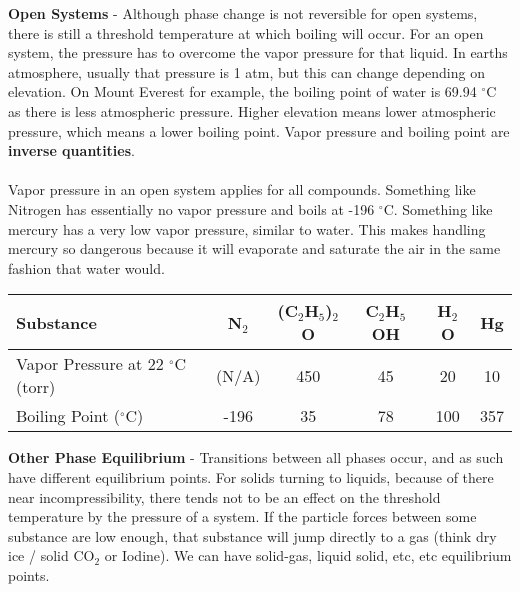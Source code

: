 \documentclass{article}
\begin{document}
\noindent\textbf{Open Systems} - Although phase	change is not reversible for open systems, there is still a threshold temperature at which boiling will occur. For an open system, the pressure has to overcome the vapor pressure for that liquid. In earths atmosphere, usually that pressure is 1 atm, but this can change depending on elevation. On Mount Everest for example, the boiling point of water is 69.94 $^{\circ} $C as there is less atmospheric pressure. Higher elevation means lower atmospheric pressure, which means a lower boiling point. Vapor pressure and boiling point are \textbf{inverse quantities}.\\
\\
Vapor pressure in an open system applies for all compounds. Something like Nitrogen has essentially no vapor pressure and boils at -196 $^{\circ}$C. Something like mercury has a very low vapor pressure, similar to water. This makes handling mercury so dangerous because it will evaporate and saturate the air in the same fashion that water would.

\vspace{10pt}
\renewcommand{\Tstrut}{\rule{0pt}{3.3ex}}         %
\renewcommand{\Bstrut}{\rule[-2ex]{0pt}{0pt}}   %
\renewcommand{\TBstrut}{\Tstrut\Bstrut}
\newcommand{\TTstrut}{\rule{0pt}{1ex}}         %
\newcommand{\BBstrut}{\rule[1ex]{0pt}{0pt}}   %
\newcommand{\TTBBstrut}{\Tstrut\Bstrut}
\hspace{-17pt}\begin{tabular}{|l|@{\qquad\quad}c@{\qquad\quad}c@{\qquad\quad}c@{\qquad\quad}c@{\qquad\quad}c@{\qquad\quad}|}
	\hline
	\textbf{Substance}                      & N$_2$ & (C$_2$H$_5$)$_2$O & C$_2$H$_5$OH & H$_2$O & Hg \TBstrut   \\
	\hline
	Vapor Pressure at 22 $^{\circ}$C (torr) & (N/A) & 450               & 45           & 20     & 10 \TTBBstrut \\
	Boiling Point ($^{\circ}$C)             & -196  & 35                & 78           & 100    & 357\TTBBstrut \\

	\hline
\end{tabular}

\vspace{15	pt}
\noindent\textbf{Other Phase Equilibrium} - Transitions between all phases occur, and as such have different equilibrium points. For solids turning to liquids, because of there near incompressibility, there tends not to be an effect on the threshold temperature by the pressure of a system. If the particle forces between some substance are low enough, that substance will jump directly to a gas (think dry ice / solid CO$_2$ or Iodine). We can have solid-gas, liquid solid, etc, etc equilibrium points.
\end{document}
